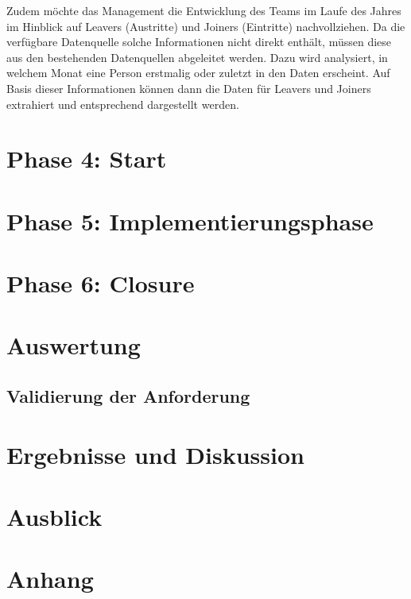 \documentclass[a4paper, 12pt]{scrartcl}
\begin{document}
Zudem möchte das Management die Entwicklung des Teams im Laufe des Jahres im Hinblick auf Leavers (Austritte) und Joiners (Eintritte) nachvollziehen. Da die verfügbare Datenquelle solche Informationen nicht direkt enthält, müssen diese aus den bestehenden Datenquellen abgeleitet werden. Dazu wird analysiert, in welchem Monat eine Person erstmalig oder zuletzt in den Daten erscheint. Auf Basis dieser Informationen können dann die Daten für Leavers und Joiners extrahiert und entsprechend dargestellt werden.

	\newpage
	\section{Phase 4: Start}
	\newpage
	\section{Phase 5: Implementierungsphase}
	\newpage
	\section{Phase 6: Closure}
	\newpage
	\section{Auswertung}
	\subsection{Validierung der Anforderung}%
	\newpage
	\section{Ergebnisse und Diskussion}
	\newpage
	\section{Ausblick}
	
	\newpage
	\section{Anhang}
	
	
\end{document}
